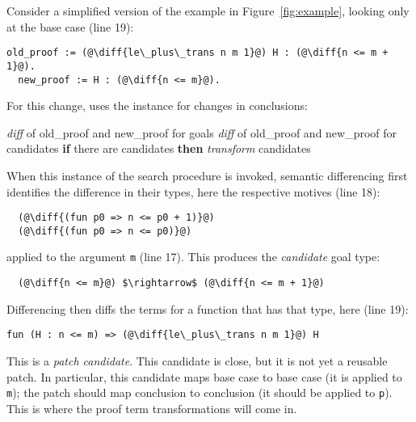 Consider a simplified version of the example in Figure~\ref{fig:example}, 
looking only at the base case (line 19):

\begin{lstlisting}[language=coq]
  old_proof := (@\diff{le\_plus\_trans n m 1}@) H : (@\diff{n <= m + 1}@).
  new_proof := H : (@\diff{n <= m}@).
\end{lstlisting}
For this change, \sysname uses the instance for changes in conclusions:

\begin{algorithm}
\footnotesize
\begin{algorithmic}[1]
    \STATE \textit{diff}  of old\_proof and new\_proof for goals
    \STATE \textit{diff}  of old\_proof and new\_proof for candidates
    \STATE \textbf{if} there are candidates \textbf{then}
    \STATE \hspace*{1em} \textit{transform} candidates
\end{algorithmic}
\end{algorithm}
When this instance of the search procedure is invoked,
semantic differencing first identifies the difference in their types, here the respective motives (line 18):

\begin{lstlisting}
  (@\diff{(fun p0 => n <= p0 + 1)}@)
  (@\diff{(fun p0 => n <= p0)}@)
\end{lstlisting}
applied to the argument \lstinline{m} (line 17).
This produces the \textit{candidate} goal type:

\begin{lstlisting}
  (@\diff{n <= m}@) $\rightarrow$ (@\diff{n <= m + 1}@)
\end{lstlisting}

Differencing then diffs the terms for a function that has that type, here (line 19):

\begin{lstlisting}[language=coq]
  fun (H : n <= m) => (@\diff{le\_plus\_trans n m 1}@) H
\end{lstlisting}
This is a \textit{patch candidate}.
This candidate is close, but it is not yet a reusable patch. In particular, this candidate
maps base case to base case (it is applied to \lstinline{m}); the patch should map conclusion to conclusion (it should
be applied to \lstinline{p}).
This is where the proof term transformations will come in.

